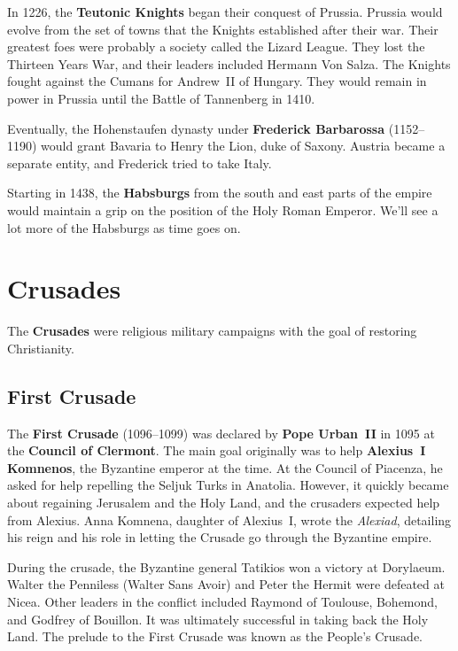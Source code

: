 In 1226, the \textbf{Teutonic Knights} began their conquest of Prussia.
Prussia would evolve from the set of towns that the Knights established after their war.
Their greatest foes were probably a society called the Lizard League.
They lost the Thirteen Years War, and their leaders included Hermann Von Salza.
The Knights fought against the Cumans for Andrew~II of Hungary.
They would remain in power in Prussia until the Battle of Tannenberg in 1410.

Eventually, the Hohenstaufen dynasty under \textbf{Frederick Barbarossa} (1152--1190)
would grant Bavaria to Henry the Lion, duke of Saxony.
Austria became a separate entity, and Frederick tried to take Italy.

Starting in 1438, the \textbf{Habsburgs} from the south and east parts of the empire
would maintain a grip on the position of the Holy Roman Emperor.
We'll see a lot more of the Habsburgs as time goes on.

\section{Crusades}

The \textbf{Crusades} were religious military campaigns with the goal of restoring Christianity.

\subsection*{First Crusade}

The \textbf{First Crusade} (1096--1099) was declared by \textbf{Pope Urban~II} in 1095
at the \textbf{Council of Clermont}.
The main goal originally was to help \textbf{Alexius~I Komnenos}, the Byzantine emperor at the time.
At the Council of Piacenza, he asked for help repelling the Seljuk Turks in Anatolia.
However, it quickly became about regaining Jerusalem and the Holy Land,
and the crusaders expected help from Alexius.
Anna Komnena, daughter of Alexius~I, wrote the \textit{Alexiad},
detailing his reign and his role in letting the Crusade go through the Byzantine empire.

During the crusade, the Byzantine general Tatikios won a victory at Dorylaeum.
Walter the Penniless (Walter Sans Avoir) and Peter the Hermit were defeated at Nicea.
Other leaders in the conflict included Raymond of Toulouse, Bohemond, and Godfrey of Bouillon.
It was ultimately successful in taking back the Holy Land.
The prelude to the First Crusade was known as the People's Crusade.

